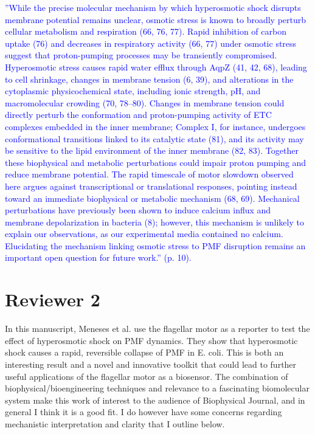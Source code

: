 \documentclass[11pt, letterpaper]{article}%
\newcommand{\revised}{\textcolor{blue}}
\begin{document}
\begin{itemize}
\begin{mdframed}
\footnotesize\revised{''While the precise molecular mechanism by which hyperosmotic shock disrupts membrane potential remains unclear, osmotic stress is known to broadly perturb cellular metabolism and respiration (66, 76, 77). Rapid inhibition of carbon uptake (76) and decreases in respiratory activity (66, 77) under osmotic stress suggest that proton-pumping processes may be transiently compromised. Hyperosmotic stress causes rapid water efflux through AqpZ (41, 42, 68), leading to cell shrinkage, changes in membrane tension (6, 39), and alterations in the cytoplasmic physicochemical state, including ionic strength, pH, and macromolecular crowding (70, 78–80). Changes in membrane tension could directly perturb the conformation and proton-pumping activity of ETC complexes embedded in the inner membrane; Complex I, for instance, undergoes conformational transitions linked to its catalytic state (81), and its activity may be sensitive to the lipid environment of the inner membrane (82, 83). Together these biophysical and metabolic perturbations could impair proton pumping and reduce membrane potential. The rapid timescale of motor slowdown observed here argues against transcriptional or translational responses, pointing instead toward an immediate biophysical or metabolic mechanism (68, 69). Mechanical perturbations have previously been shown to induce calcium influx and membrane depolarization in bacteria (8); however, this mechanism is unlikely to explain our observations, as our experimental media contained no calcium. Elucidating the mechanism linking osmotic stress to PMF disruption remains an important open question for future work.'' (p. 10).} 
\end{mdframed}
    
\end{itemize}

\section*{Reviewer 2} In this manuscript, Meneses et al. use the flagellar motor as a reporter to test the effect of hyperosmotic shock on PMF dynamics. They show that hyperosmotic shock causes a rapid, reversible collapse of PMF in E. coli. This is both an interesting result and a novel and innovative toolkit that could lead to further useful applications of the flagellar motor as a biosensor. The combination of biophysical/bioengineering techniques and relevance to a fascinating biomolecular system make this work of interest to the audience of Biophysical Journal, and in general I think it is a good fit. I do however have some concerns regarding mechanistic interpretation and clarity that I outline below.
\end{document}
